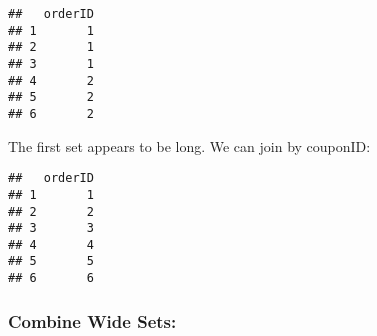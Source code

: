 \documentclass[10pt]{report}
\newenvironment{Shaded}{}{}
\newcommand{\KeywordTok}[1]{\textcolor[rgb]{0.00,0.44,0.13}{\textbf{{#1}}}}
\newcommand{\DataTypeTok}[1]{\textcolor[rgb]{0.56,0.13,0.00}{{#1}}}
\newcommand{\DecValTok}[1]{\textcolor[rgb]{0.25,0.63,0.44}{{#1}}}
\newcommand{\StringTok}[1]{\textcolor[rgb]{0.25,0.44,0.63}{{#1}}}
\newcommand{\NormalTok}[1]{{#1}}
\begin{document}
\begin{verbatim}
##   orderID
## 1       1
## 2       1
## 3       1
## 4       2
## 5       2
## 6       2
\end{verbatim}

The first set appears to be long. We can join by couponID:

\begin{Shaded}
\end{Shaded}

\begin{Shaded}
\end{Shaded}

\begin{verbatim}
##   orderID
## 1       1
## 2       2
## 3       3
## 4       4
## 5       5
## 6       6
\end{verbatim}

\subsubsection{Combine Wide Sets:}\label{combine-wide-sets-3}
\end{document}
